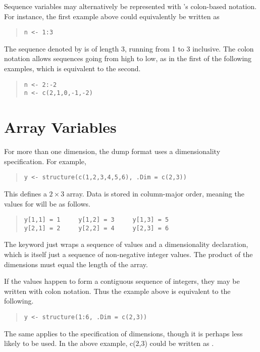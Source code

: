 Sequence variables may alternatively be represented with \R's
colon-based notation.  For instance, the first example above could
equivalently be written as
%
\begin{quote}
\begin{Verbatim} 
n <- 1:3
\end{Verbatim}
\end{quote}
% 
The sequence denoted by  is of length 3, running from 1 to 3
inclusive.  The colon notation allows sequences going from high to
low, as in the first of the following examples, which is equivalent to
the second.
%
\begin{quote}
\begin{Verbatim}[fontsize=\small]
n <- 2:-2
n <- c(2,1,0,-1,-2)
\end{Verbatim}
\end{quote}
%


\section{Array Variables}

For more than one dimension, the dump format uses a dimensionality
specification.  For example,
%
\begin{quote}
\begin{verbatim}
y <- structure(c(1,2,3,4,5,6), .Dim = c(2,3))
\end{verbatim}
\end{quote}
%
This defines a $2 \times 3$ array.  Data is stored in column-major
order, meaning the values for  will be as follows.
%
\begin{quote}
\begin{Verbatim}[fontsize=\small]
y[1,1] = 1     y[1,2] = 3     y[1,3] = 5    
y[2,1] = 2     y[2,2] = 4     y[2,3] = 6
\end{Verbatim}
\end{quote}
%
The  keyword just wraps a sequence of values and a
dimensionality declaration, which is itself just a sequence of
non-negative integer values.  The product of the dimensions must equal
the length of the array.

If the values happen to form a contiguous sequence of integers,
they may be written with colon notation.  Thus the example above is
equivalent to the following.
%
\begin{quote}
\begin{verbatim}
y <- structure(1:6, .Dim = c(2,3))
\end{verbatim}
\end{quote}
%
The same applies to the specification of dimensions, though it is
perhaps less likely to be used. In the above example,
c(2,3) could be written as .

